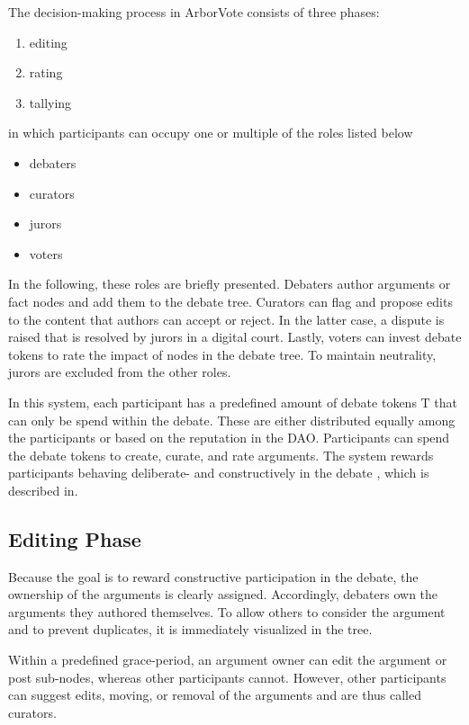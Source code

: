 \documentclass[%
aip,
amsmath,amssymb,
reprint,%
unsortedaddress,
nofootinbib
]{revtex4-2}
\newcommand{\T}{\text{T}}
\begin{document}
The decision-making process in ArborVote consists of three phases:
\begin{enumerate}[noitemsep]
	\item editing
	\item rating
	\item tallying
\end{enumerate}
in which participants can occupy one or multiple of the roles listed below
\begin{itemize}[noitemsep]
	\item debaters
	\item curators
	\item jurors
	\item voters
\end{itemize}
In the following, these roles are briefly presented.
Debaters author arguments or fact nodes and add them to the debate tree.
Curators can flag and propose edits to the content that authors can accept or reject.
In the latter case, a dispute is raised that is resolved by jurors in a digital court.
Lastly, voters can invest debate tokens to rate the impact of nodes in the debate tree.
To maintain neutrality, jurors are excluded from the other roles.

In this system, 
each participant has a predefined amount of debate tokens $\T$ that can only be spend within the debate.
These are either distributed equally among the participants or based on the reputation in the \ac{DAO}.
%
Participants can spend the debate tokens 
to create, curate, and rate arguments.
%
The system rewards participants behaving deliberate- and constructively in the debate
, which is described in.

\subsection{Editing Phase}\label{sec:EditingPhase}
Because the goal is to reward constructive participation in the debate, 
the ownership of the arguments is clearly assigned.
Accordingly, debaters own the arguments they authored themselves.
To allow others to consider the argument and to prevent duplicates, it is immediately visualized in the tree.

Within a predefined grace-period, an argument owner can edit the argument or post sub-nodes, 
whereas other participants cannot.
However, other participants can suggest edits, moving, or removal of the arguments and are thus called curators.
\end{document}
